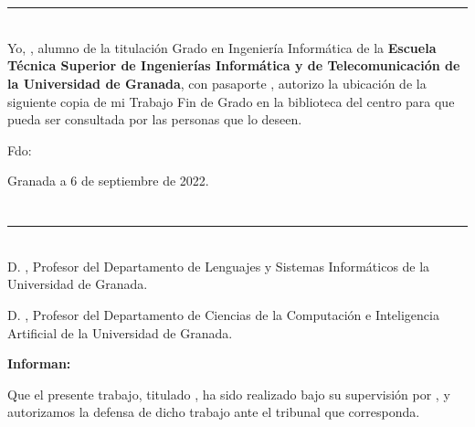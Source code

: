 \chapter*{}
\thispagestyle{empty}

\noindent\rule[-1ex]{\textwidth}{2pt}\\[4.5ex]

Yo, \textbf{\myName}, alumno de la titulación Grado en Ingeniería Informática de la \textbf{Escuela Técnica Superior
de Ingenierías Informática y de Telecomunicación de la Universidad de Granada}, con pasaporte \myDNI, autorizo la
ubicación de la siguiente copia de mi Trabajo Fin de Grado en la biblioteca del centro para que pueda ser
consultada por las personas que lo deseen.

\vspace{6cm}

\noindent Fdo: \myName

\vspace{2cm}

\begin{flushright}
Granada a 6 de septiembre de 2022.
\end{flushright}


\chapter*{}
\thispagestyle{empty}

\noindent\rule[-1ex]{\textwidth}{2pt}\\[4.5ex]

D. \textbf{\myProf}, Profesor del Departamento de Lenguajes y Sistemas Informáticos de la Universidad de Granada.

\vspace{0.25cm}

D. \textbf{\myOtherProf}, Profesor del Departamento de Ciencias de la Computación e Inteligencia Artificial de la Universidad de Granada.


\vspace{0.25cm}

\textbf{Informan:}

\vspace{0.25cm}

Que el presente trabajo, titulado \textit{\textbf{\myTitle}},
ha sido realizado bajo su supervisión por \textbf{\myName}, y autorizamos la defensa de dicho trabajo ante el tribunal
que corresponda.

\vspace{0.5cm}

